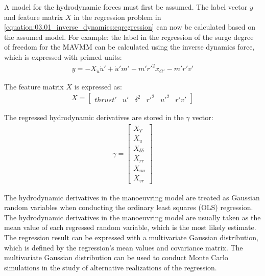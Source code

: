 \noindent A model for the hydrodynamic forces must first be assumed.
The label vector \(y\) and feature matrix \(X\) in the regression problem in \autoref{equation:03.01_inverse_dynamics:eqregression} can now be calculated based on the assumed model. For example: the label in the regression of the surge degree of freedom for the MAVMM can be calculated using the inverse dynamics force, which is expressed with primed units:
\begin{equation}\label{equation:03.01_inverse_dynamics:diff_eq_X_y}
\begin{split}\displaystyle y = - X_{\dot{u}} \dot{u}' + \dot{u}' m' - m' r'^{2} x_{G'} - m' r' v'\end{split}
\end{equation}

\noindent The feature matrix \(X\) is expressed as:
\begin{equation}\label{equation:03.01_inverse_dynamics:diff_eq_X_X}
\begin{split}\displaystyle X = \left[\begin{matrix}thrust' & u' & \delta^{2} & r'^{2} & u'^{2} & r' v'\end{matrix}\right]\end{split}
\end{equation}

\noindent The regressed hydrodynamic derivatives are stored in the \(\gamma\) vector:
\begin{equation}\label{equation:03.01_inverse_dynamics:diff_eq_X_beta}
\begin{split}\displaystyle \gamma = \left[\begin{matrix}X_{T}\\X_{u}\\X_{\delta\delta}\\X_{rr}\\X_{uu}\\X_{vr}\end{matrix}\right]\end{split}
\end{equation}

\noindent The hydrodynamic derivatives in the manoeuvring model are treated as Gaussian random variables when conducting the ordinary least squares (OLS) regression. The hydrodynamic derivatives in the manoeuvring model are usually taken as the mean value of each regressed random variable, which is the most likely estimate. The regression result can be expressed with a multivariate Gaussian distribution, which is defined by the regression’s mean values and covariance matrix. The multivariate Gaussian distribution can be used to conduct Monte Carlo simulations in the study of alternative realizations of the regression.


